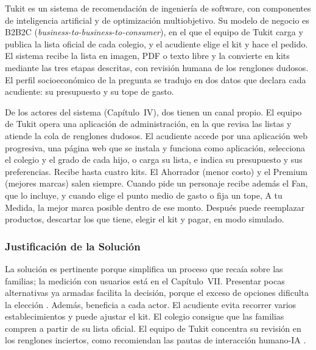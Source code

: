 Tukit es un sistema de recomendación de ingeniería de software, con componentes de inteligencia artificial y
de optimización multiobjetivo. Su modelo de negocio es B2B2C
(\emph{business-to-business-to-consumer}), en el que el equipo de Tukit carga y publica la lista oficial de cada
colegio, y el acudiente elige el kit y hace el pedido. El sistema recibe la lista en imagen, PDF o texto libre y la convierte en kits mediante las tres etapas
descritas, con revisión humana de los renglones dudosos. El perfil socioeconómico de la pregunta se tradujo en dos datos que declara cada acudiente: su
presupuesto y su tope de gasto.\par

De los actores del sistema (Capítulo~IV), dos tienen un canal propio. El equipo de Tukit opera una
aplicación de administración, en la que revisa las listas y atiende la cola de renglones dudosos. El acudiente
accede por una aplicación web progresiva, una página web que se instala y funciona como aplicación,
selecciona el colegio y el grado de cada hijo, o carga su lista, e indica su presupuesto y sus
preferencias. Recibe hasta cuatro kits. El Ahorrador (menor costo) y el Premium (mejores marcas) salen
siempre. Cuando pide un personaje recibe además el Fan, que lo incluye, y cuando elige el punto medio de gasto o fija un tope, A tu Medida, la mejor
marca posible dentro de ese monto. Después puede reemplazar productos, descartar los que tiene, elegir el kit y pagar, en modo simulado.\par

\subsubsection{Justificación de la Solución}

La solución es pertinente porque simplifica un proceso que recaía sobre las familias; la medición con
usuarios está en el Capítulo~VII. Presentar pocas alternativas ya armadas facilita la decisión, porque el
exceso de opciones dificulta la elección \citep{iyengar_when_2000}. Además, beneficia a cada actor. El
acudiente evita recorrer varios establecimientos y puede ajustar el kit. El colegio consigue que las familias
compren a partir de su lista oficial. El equipo de Tukit concentra su revisión en los renglones inciertos, como recomiendan las pautas de
interacción humano-IA \citep{amershi_guidelines_2019}.\par

